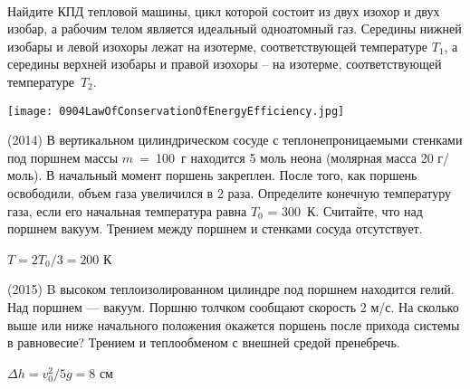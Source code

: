 \begin{ex}
\hspace{0pt} \\
\begin{minipage}{.65\textwidth}
Найдите КПД тепловой машины, цикл которой состоит из двух изохор и двух изобар, а рабочим телом является идеальный одноатомный газ. 
Середины нижней изобары и левой изохоры лежат на изотерме, соответствующей температуре $T_1$, 
а середины верхней изобары и правой изохоры -- на изотерме, соответствующей температуре~$T_2$.
\end{minipage}
\begin{minipage}{.35\textwidth}
\centering
\texttt{[image: 0904LawOfConservationOfEnergyEfficiency.jpg]}
\end{minipage}
\begin{ans}

\end{ans}
\end{ex}

\begin{ex}
(2014) В вертикальном цилиндрическом сосуде с теплонепроницаемыми стенками под поршнем массы $m$~=~100~г находится 5 моль неона 
(молярная масса 20 г/моль). В начальный момент поршень закреплен. После того, как поршень освободили, объем газа увеличился в 2 раза. 
Определите конечную температуру газа, если его начальная температура равна $T_0$ = 300~К. Считайте, что над поршнем вакуум. 
Трением между поршнем и стенками сосуда отсутствует.
\begin{ans}
$T=2T_0/3 = 200$ К
\end{ans}
\end{ex}

\begin{ex}
(2015) B высоком теплоизолированном цилиндре под поршнем находится гелий. Над поршнем — вакуум. Поршню толчком сообщают скорость 2 м/с. На сколько выше или ниже начального положения окажется поршень после прихода системы в равновесие? Трением и теплообменом с внешней средой пренебречь.
\begin{ans}
$\Delta h = v_0^2 / 5g = 8$ см
\end{ans}
\end{ex}

